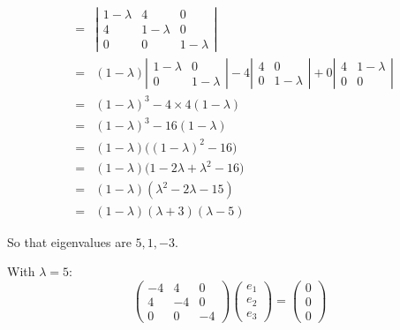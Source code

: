 \documentclass{article}
\begin{document}
\begin{enumerate}
\begin{itemize}
\begin{eqnarray*}
&=& \left| \begin{array}{ccc}  1 - \lambda & 4 & 0 \\
                          4 & 1-\lambda & 0 \\
                          0 & 0 & 1 - \lambda  \end{array} \right| \\
 &=& (1-\lambda) \left| \begin{array}{cc}  1 - \lambda & 0 \\ 0 & 1 - \lambda \end{array} \right| -
4 \left| \begin{array}{cc}  4 & 0 \\ 0 & 1 - \lambda \end{array} \right| + 
0 \left| \begin{array}{cc}  4 & 1 - \lambda \\ 0 & 0 \end{array} \right|\\
&=& (1 - \lambda)^{3} - 4 \times 4(1 - \lambda)\\
&=& (1-\lambda)^{3} - 16(1-\lambda)\\
&=& (1-\lambda) \big( (1-\lambda)^{2}-16 \big)\\
&=& (1 - \lambda) \big( 1 - 2\lambda + \lambda^{2} - 16 \big)\\
&=& (1-\lambda)(\lambda^{2} - 2 \lambda - 15)\\
&=& (1-\lambda)(\lambda+3)(\lambda-5)
\end{eqnarray*}

So that eigenvalues are $5, 1, -3$.

With $\lambda = 5$:
\begin{displaymath}
\left( \begin{array}{rrr} -4 & 4 & 0 \\ 4 & -4 & 0 \\ 0 & 0 & -4 \end{array} \right) \left( \begin{array}{r} e_{1} \\ e_{2} \\ e_{3} \end{array} \right) = 
\left( \begin{array}{r} 0 \\ 0 \\ 0 \end{array} \right)
\end{displaymath}


\end{itemize}
\end{enumerate}
\end{document}

